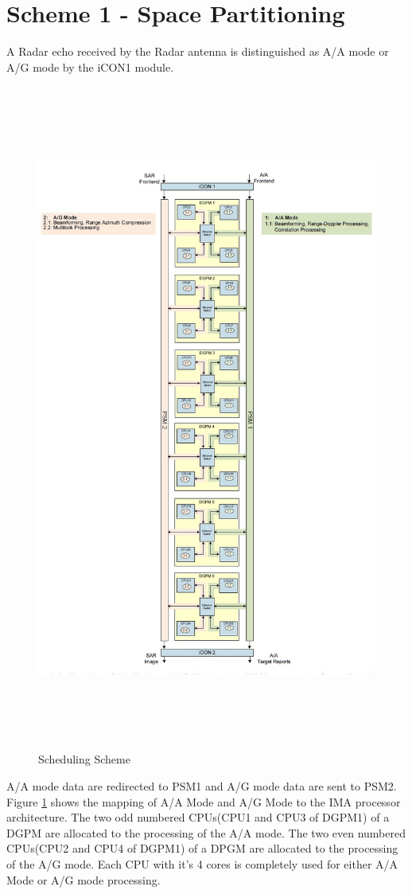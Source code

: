\section{Scheme 1 - Space Partitioning}
\label{sec:scheme_1}
A Radar echo received by the Radar antenna is distinguished as A/A mode or A/G mode by the iCON1 module. 
\begin{figure}[h!]
	\centering
	\includegraphics[width=160mm, height=220mm]{figures/scheme1}
	\caption{ Scheduling Scheme}
	\label{fig:existing_analysis:scheme1}
\end{figure}
\FloatBarrier
A/A mode data are redirected to PSM1 and A/G mode data are sent to PSM2. Figure \ref{fig:existing_analysis:scheme1} shows the mapping of A/A Mode and A/G Mode to the IMA processor architecture. The two odd numbered CPUs(CPU1 and CPU3 of DGPM1) of a  DGPM are allocated to the processing of the A/A mode. The two even numbered CPUs(CPU2 and CPU4 of DGPM1)  of a DPGM are allocated to the processing of the A/G mode. Each CPU with it's 4 cores is completely used for either A/A Mode or A/G mode processing.


